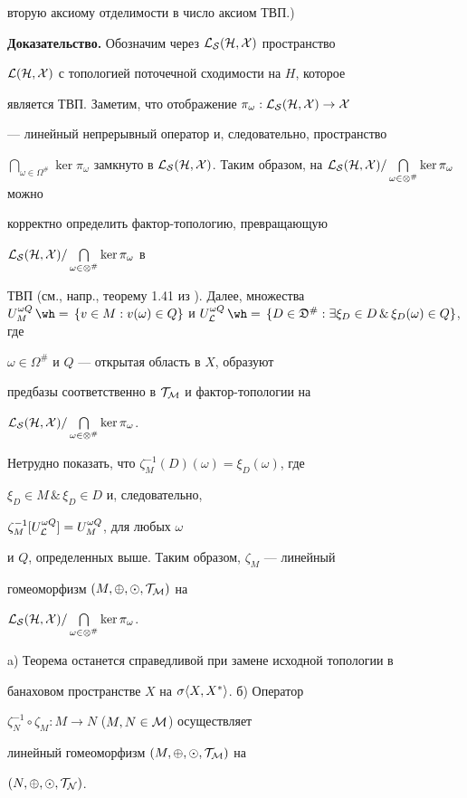 вторую аксиому отделимости в число аксиом ТВП.) 


\medskip 


 


{\bf Доказательство.} Обозначим через $\cal L_S(H,X)$ пространство 


$\cal L(H,X)$ с топологией поточечной сходимости на $H$, которое 


является ТВП. Заметим, что отображение $\pi_\omega:\cal L_S(H,X)\to X$ 


--- линейный непрерывный оператор и, следовательно, пространство 


$\bigcap\limits_{\omega\in\Omega^{\#}}\ker\pi_\omega$ замкнуто в $\cal 


L_S(H,X)$. Таким образом, на $\cal 


L_S(H,X)/\bigcap\limits_{\omega\in\Omega^{\#}}\ker\pi_\omega$ можно 


корректно определить фактор-топологию, превращающую 


$\cal L_S(H,X)/\bigcap\limits_{\omega\in\Omega^{\#}}\ker\pi_\omega$ в 


ТВП (см., напр., теорему 1.41 из \cite{15}). Далее, множества $U^{\omega 


Q}_M\hateq\{v\in M:v(\omega)\in Q\}$ и $U^{\omega Q}_{\cal L}\hateq 


\{D\in\frak D^{\#}: \exists\xi_D\in D\,\& \, \xi_D(\omega)\in Q\}$, где 


$\omega\in\Omega^{\#}$ и $Q$ --- открытая область в $X$, образуют 


предбазы соответственно в $\cal T_M$ и фактор-топологии на 


$\cal L_S(H,X)/\bigcap\limits_{\omega\in\Omega^{\#}}\ker\pi_\omega$. 


Нетрудно показать, что $\zeta^{-1}_M(D)(\omega)=\xi_D(\omega)$, где 


$\xi_D\in M\, \&\, \xi_D\in D$ и, следовательно, 


$\zeta^{-1}_M[U^{\omega Q}_{\cal L}]=U^{\omega Q}_M$, для любых $\omega$ 


и $Q$, определенных выше. Таким образом, $\zeta_M$ --- линейный 


гомеоморфизм $(M,\oplus,\odot,\cal T_M)$ на 


$\cal L_S(H,X)/\bigcap\limits_{\omega\in\Omega^{\#}}\ker\pi_\omega$. 


 


\begin{note} 


a) Теорема останется справедливой при замене исходной топологии в 


банаховом пространстве $X$ на $\sigma\langle X,X^*\rangle$. б) Оператор 


$\zeta^{-1}_N\circ\zeta_M:M\to N$ ($M,N\in\cal M$) осуществляет 


линейный гомеоморфизм $(M,\oplus,\odot,\cal T_M)$ на 


$(N,\oplus,\odot,\cal T_N)$. 


\end{note} 



